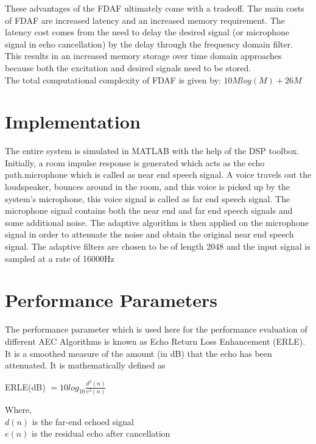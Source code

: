 \documentclass[conference]{IEEEtran}
\begin{document}
These advantages of the FDAF ultimately come with a tradeoff. The main costs of FDAF are increased latency and an increased memory requirement. The latency cost comes from the need to delay the desired signal (or microphone signal in echo cancellation) by the delay through the frequency domain filter. This results in an increased memory storage over time domain approaches because both the excitation and desired signals need to be stored.\\
The total computational complexity of FDAF is given by: $10M log(M) + 26M$

\section{Implementation}
The entire system is simulated in MATLAB with the help of the DSP toolbox. Initially, a room impulse response is generated which acts as the echo path.microphone which is called as near end speech signal. A voice travels out the loudspeaker, bounces around in the room, and this voice is picked up by the system's microphone, this voice signal is called as far end speech signal. The microphone signal contains both the near end and far end speech signals and some additional noise. The adaptive algorithm is then applied on the microphone signal in order to attenuate the noise and obtain the original near end speech signal. The adaptive filters are chosen to be of length 2048 and the input signal is sampled at a rate of 16000Hz

\section{Performance Parameters}
The performance parameter which is used here for the performance evaluation of different AEC Algorithms is known as Echo Return Loss Enhancement (ERLE).\\ 

It is a smoothed measure of the amount (in dB) that the echo has been attenuated. It is mathematically defined as \\
	\begin{center}
	ERLE(dB) $= 10log_{10}{\frac{d^2(n)}{e^2(n)}}$
	\end{center}
Where,\\
$d(n)$ is the far-end echoed signal \\
$e(n)$ is the residual echo after cancellation
\end{document}
